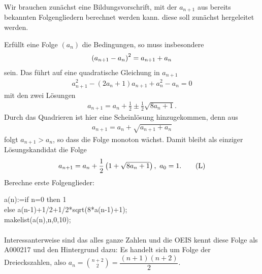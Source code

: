 \documentclass[11pt,a4paper]{article}
\begin{document}
\begin{loesung}
  Wir brauchen zunächst eine Bildungsvorschrift, mit der $a_{n+1}$ aus bereits
  bekannten Folgengliedern berechnet werden kann. diese soll zunächst
  hergeleitet werden.

  Erfüllt eine Folge $(a_n)$ die Bedingungen, so muss insbesondere
  \begin{gather*}
    \left(a_{n+1}-a_n\right)^2=a_{n+1}+a_n
  \end{gather*}
  sein.  Das führt auf eine quadratische Gleichung in $a_{n+1}$
  \begin{gather*}
    a_{n+1}^2-(2a_n+1)a_{n+1}+a_n^2-a_n=0
  \end{gather*}
  mit den zwei Lösungen
  \begin{gather*}
    a_{n+1}=a_n+\frac12 \pm \frac12\sqrt{8a_n+1}. 
  \end{gather*}
  Durch das Quadrieren ist hier eine Scheinlösung hinzugekommen, denn aus
  \begin{gather*}
    a_{n+1}=a_n+\sqrt{a_{n+1}+a_n}
  \end{gather*}
  folgt $a_{n+1}>a_n$, so dass die Folge monoton wächst.  Damit bleibt als
  einziger Lösungskandidat die Folge
  \begin{gather*}
    a_{n+1}=a_n+\frac12\left(1+\sqrt{8a_n+1}\right),\ a_0=1. \tag{L} 
  \end{gather*}
  Berechne erste Folgenglieder:
  \begin{code}
    a(n):=if n=0 then 1\\
    else a(n-1)+1/2+1/2*sqrt(8*a(n-1)+1);\\[4pt]
    makelist(a(n),n,0,10);
  \end{code}
  \begin{gather*}    
    [1, 3, 6, 10, 15, 21, 28, 36, 45, 55, 66]
  \end{gather*}
  Interessanterweise sind das alles ganze Zahlen und die OEIS kennt diese
  Folge als A000217 und den Hintergrund dazu: Es handelt sich um Folge der
  Dreieckszahlen, also $a_n=\binom{n+2}{2}=\dfrac{(n+1)(n+2)}{2}$. 
\end{loesung}
\end{document}
